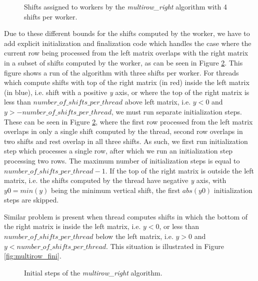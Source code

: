 \begin{figure}[ht]
	\centering
	\def\svgwidth{\textwidth}
	
	\caption{Shifts assigned to workers by the \textit{multirow\_right} algorithm with 4 shifts per worker.}
	\label{fig:multirow_shifts}
\end{figure}

Due to these different bounds for the shifts computed by the worker, we have to add explicit initialization and finalization code which handles the case where the current row being processed from the left matrix overlaps with the right matrix in a subset of shifts computed by the worker, as can be seen in Figure \ref{fig:multirow_init}. This figure shows a run of the algorithm with three shifts per worker. For threads which compute shifts with top of the right matrix (in red) inside the left matrix (in blue), i.e. shift with a positive \textit{y} axis, or where the top of the right matrix is less than $number\_of\_shifts\_per\_thread$ above left matrix, i.e. $y < 0$ and $y > -number\_of\_shifts\_per\_thread$, we must run separate initialization steps. These can be seen in Figure \ref{fig:multirow_init}, where the first row processed from the left matrix overlaps in only a single shift computed by the thread, second row overlaps in two shifts and rest overlap in all three shifts. As such, we first run initialization step which processes a single row, after which we run an initialization step processing two rows. The maximum number of initialization steps is equal to $number\_of\_shifts\_per\_thread - 1$. If the top of the right matrix is outside the left matrix, i.e. the shifts computed by the thread have negative \textit{y} axis, with $y0 = min(y)$ being the minimum vertical shift, the first $abs(y0)$ initialization steps are skipped. 

Similar problem is present when thread computes shifts in which the bottom of the right matrix is inside the left matrix, i.e. $y < 0$, or less than $number\_of\_shifts\_per\_thread$ below the left matrix, i.e. $y > 0$ and $y < number\_of\_shifts\_per\_thread$. This situation is illustrated in Figure \ref{fig:multirow_fini}.

\begin{figure}[ht]
	\centering
	\def\svgwidth{0.5\textwidth}
	
	\caption{Initial steps of the \textit{multirow\_right} algorithm.}
	\label{fig:multirow_init}
\end{figure}

